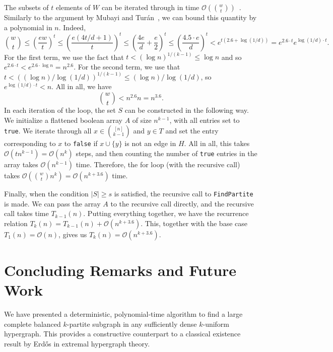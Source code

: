 \documentclass{amsart}
\newcommand{\bigO}[1]{\ensuremath{\mathcal{O}\left(#1\right)}}
\begin{document}
The subsets of $t$ elements of $W$ can be iterated through in time $\bigO{\binom{w}{t}}$~\cite{reingold1977combinatorial}.
Similarly to the argument by Mubayi and Tur\'{a}n~\cite{MUBAYI2010174}, we can bound this quantity by a polynomial in $n$.
Indeed,
\[
    \binom{w}{t} \leq \left(\frac{ew}{t}\right)^t
    \leq \left(\frac{e(4t/d + 1)}{t}\right)^t
    \leq \left(\frac{4e}{d} + \frac{e}{2}\right)^t
    \leq \left(\frac{4.5 \cdot e}{d}\right)^t < e^{t(2.6 + \log (1/d))}
    = e^{2.6 \cdot t} e^{\log (1/d) \cdot t}.
\]
For the first term, we use the fact that $t < (\log n)^{1/(k-1)} \leq \log n$
and so ${e^{2.6 \cdot t} < e^{2.6 \cdot \log n} = n^{2.6}}$.
For the second term, we use that $t < ((\log n)/\log(1/d))^{1/(k-1)} \leq (\log n)/\log(1/d)$,
so $e^{\log (1/d) \cdot t} < n$.
All in all, we have
\[
    \binom{w}{t} < n^{2.6} n = n^{3.6}.
\]
In each iteration of the loop, the set $S$ can be constructed in the following way.
We initialize a flattened boolean array $A$ of size $n^{k-1}$,
with all entries set to \texttt{true}.
We iterate through all $x \in \binom{[n]}{k-1}$ and $y \in T$
and set the entry corresponding to $x$ to \texttt{false} if $x \cup \{y\}$ is not an edge in $H$.
All in all, this takes $\bigO{tn^{k-1}} = \bigO{n^k}$ steps, and then counting the number of \texttt{true} entries in the array takes $\bigO{n^{k-1}}$ time.
Therefore, the for loop (with the recursive call) takes $\bigO{\binom{w}{t} n^{k}} = \bigO{n^{k+3.6}}$ time.

Finally, when the condition $|S| \geq s$ is satisfied, the recursive call to \texttt{FindPartite} is made.
We can pass the array $A$ to the recursive call directly, and the recursive call takes time $T_{k-1}(n)$.
Putting everything together, we have the recurrence relation $T_k(n) = T_{k-1}(n) + \bigO{n^{k+3.6}}$.
This, together with the base case $T_1(n) = \bigO{n}$, gives us $T_k(n) = \bigO{n^{k+3.6}}$.

\section{Concluding Remarks and Future Work}\label{sec:conclusion-and-future-work}

We have presented a deterministic,
polynomial-time algorithm to find a large complete balanced $k$-partite subgraph in any sufficiently dense $k$-uniform hypergraph.
This provides a constructive counterpart to a classical existence result by Erd\H{o}s in extremal hypergraph theory.
\end{document}
